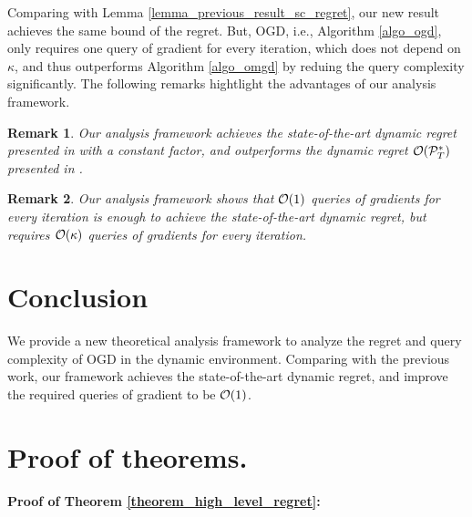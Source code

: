 \documentclass{article}
\newtheorem{Remark}{\bf{Remark}}
\begin{document}
Comparing with Lemma \ref{lemma_previous_result_sc_regret}, our new result achieves the same bound of the regret. But, OGD, i.e., Algorithm \ref{algo_ogd}, only requires one query of gradient for every iteration, which does not depend on $\kappa$, and thus outperforms Algorithm \ref{algo_omgd} by reduing the query complexity significantly. The following remarks hightlight the advantages of our analysis framework.
\begin{Remark}
Our analysis framework achieves the state-of-the-art dynamic regret presented in \cite{Zhang:2016wl} with a constant factor, and outperforms the dynamic regret ${\mathcal{O}}({\mathcal{P}}_T^{\ast})$ presented in \cite{Mokhtari:2016jz}. 
\end{Remark}
\begin{Remark}
Our analysis framework shows that ${\mathcal{O}}(1)$ queries of gradients for every iteration is enough to achieve the state-of-the-art dynamic regret, but \cite{Zhang:2016wl} requires ${\mathcal{O}}(\kappa)$ queries of gradients for every iteration.
\end{Remark}



\section{Conclusion}
\label{sect_conclude}
We provide a new theoretical analysis framework to analyze the regret and query complexity of OGD in the dynamic environment. Comparing with the previous work, our framework achieves the state-of-the-art dynamic regret, and improve the required queries of gradient to be ${\mathcal{O}}(1)$. 






\appendix

\section*{Proof of theorems.}

\textbf{Proof of Theorem \ref{theorem_high_level_regret}:}
\end{document}
